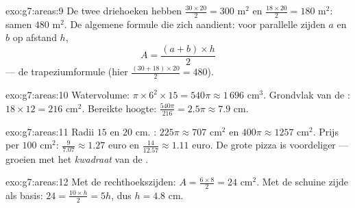 \begin{solution}{exo:g7:areas:9}
De twee driehoeken hebben  $\frac{30 \times 20}{2} = 300$ m$^2$ en
$\frac{18 \times 20}{2} = 180$ m$^2$: samen $480$ m$^2$. De algemene formule die
zich aandient: voor parallelle zijden $a$ en $b$ op afstand $h$,
\[
A = \frac{(a + b) \times h}{2}
\]
--- de trapeziumformule (hier $\frac{(30+18)\times 20}{2} = 480$).
\end{solution}

\begin{solution}{exo:g7:areas:10}
Watervolume: $\pi \times 6^2 \times 15 = 540\pi \approx 1\,696$ cm$^3$. Grondvlak van
de : $18 \times 12 = 216$ cm$^2$. Bereikte hoogte:
$\frac{540\pi}{216} = 2.5\pi \approx 7.9$ cm.
\end{solution}

\begin{solution}{exo:g7:areas:11}
Radii $15$ en $20$ cm. : $225\pi \approx 707$ cm$^2$ en
$400\pi \approx 1257$ cm$^2$. Prijs per $100$ cm$^2$:
$\frac{9}{7.07} \approx 1.27$ euro en $\frac{14}{12.57} \approx 1.11$ euro. De grote
pizza is voordeliger ---  groeien met het \emph{kwadraat} van de
.
\end{solution}

\begin{solution}{exo:g7:areas:12}
Met de rechthoekszijden: $A = \frac{6 \times 8}{2} = 24$ cm$^2$. Met de schuine zijde
als basis: $24 = \frac{10 \times h}{2} = 5h$, dus $h = 4.8$ cm.
\end{solution}

